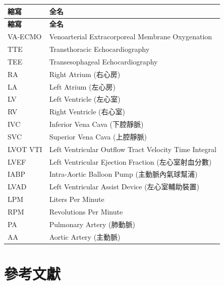 \documentclass[12pt,a4paper]{article}
\begin{document}
\begin{longtable}{p{3cm}p{11cm}}
\toprule
\textbf{縮寫} & \textbf{全名} \\
\midrule
\endfirsthead

\toprule
\textbf{縮寫} & \textbf{全名} \\
\midrule
\endhead

\bottomrule
\endfoot

VA-ECMO & Venoarterial Extracorporeal Membrane Oxygenation \\
TTE & Transthoracic Echocardiography \\
TEE & Transesophageal Echocardiography \\
RA & Right Atrium (右心房) \\
LA & Left Atrium (左心房) \\
LV & Left Ventricle (左心室) \\
RV & Right Ventricle (右心室) \\
IVC & Inferior Vena Cava (下腔靜脈) \\
SVC & Superior Vena Cava (上腔靜脈) \\
LVOT VTI & Left Ventricular Outflow Tract Velocity Time Integral \\
LVEF & Left Ventricular Ejection Fraction (左心室射血分數) \\
IABP & Intra-Aortic Balloon Pump (主動脈內氣球幫浦) \\
LVAD & Left Ventricular Assist Device (左心室輔助裝置) \\
LPM & Liters Per Minute \\
RPM & Revolutions Per Minute \\
PA & Pulmonary Artery (肺動脈) \\
AA & Aortic Artery (主動脈) \\
\bottomrule
\end{longtable}

\section{參考文獻}
\end{document}
